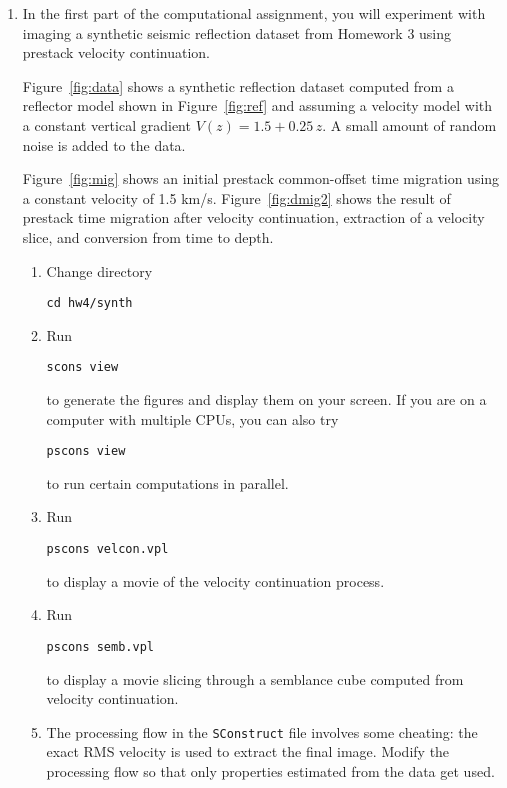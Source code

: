 \begin{enumerate}
\item In the first part of the computational assignment, you will experiment with 
  imaging a synthetic seismic reflection dataset from Homework 3 using
  prestack velocity continuation.



Figure~\ref{fig:data} shows a synthetic reflection dataset computed
from a reflector model shown in Figure~\ref{fig:ref} and assuming a
velocity model with a constant vertical gradient $V(z) = 1.5 +
0.25\,z$. A small amount of random noise is added to the data.

Figure~\ref{fig:mig} shows an initial prestack common-offset time
migration using a constant velocity of 1.5 km/s. 
Figure~\ref{fig:dmig2} shows the result of prestack time
migration after velocity continuation, extraction of a velocity slice,
and conversion from time to depth.

\begin{enumerate}
\item Change directory 
\begin{verbatim}
cd hw4/synth
\end{verbatim}
\item Run
\begin{verbatim}
scons view
\end{verbatim}
to generate the figures and display them on your screen.
If you are on a computer with multiple CPUs, you
can also try
\begin{verbatim}
pscons view
\end{verbatim}
to run certain computations in parallel.
\item Run 
\begin{verbatim}
pscons velcon.vpl
\end{verbatim}
to display a movie of the velocity continuation process.
\item Run 
\begin{verbatim}
pscons semb.vpl
\end{verbatim}
to display a movie slicing through a semblance cube computed from
velocity continuation.
\item The processing flow in the \texttt{SConstruct} file involves
  some cheating: the exact RMS velocity is used to extract the final
  image. Modify the processing flow so that only properties estimated
  from the data get used. 
\end{enumerate}


\end{enumerate}
